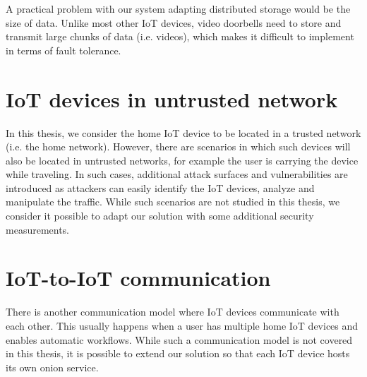 A practical problem with our system adapting distributed storage would be the size of data. Unlike most other IoT devices, video doorbells need to store and transmit large chunks of data (i.e. videos), which makes it difficult to implement in terms of fault tolerance.


\section{IoT devices in untrusted network}
In this thesis, we consider the home IoT device to be located in a trusted network (i.e. the home network). However, there are scenarios in which such devices will also be located in untrusted networks, for example the user is carrying the device while traveling. In such cases, additional attack surfaces and vulnerabilities are introduced as attackers can easily identify the IoT devices, analyze and manipulate the traffic. While such scenarios are not studied in this thesis, we consider it possible to adapt our solution with some additional security measurements. 

\section{IoT-to-IoT communication}
There is another communication model where IoT devices communicate with each other. This usually happens when a user has multiple home IoT devices and enables automatic workflows. While such a communication model is not covered in this thesis, it is possible to extend our solution so that each IoT device hosts its own onion service.